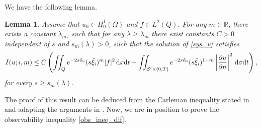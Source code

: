 \documentclass{aims}
\newtheorem{lemma}[theorem]{Lemma}
\theoremstyle{definition}
\def\dx{\,\textnormal{d}x}
\def\dt{\textnormal{d}t}
\def\d{\,\textnormal{d}}
\begin{document}
We have the following lemma.
%
\begin{lemma}\label{lemma_car_boundary}
Assume that $u_0\in H_0^1(\Omega)$ and $f\in L^2(Q)$. For any $m\in \mathbb R$, there exists a constant $\lambda_m$, such that for any $\lambda\geq \lambda_m$ there exist constants $C>0$ independent of $s$ and $s_m(\lambda)>0$, such that the solution of \eqref{sys_u} satisfies
%
\begin{equation}\label{Est1}
I(u;i,m)\leq C\left(\iint_{Q}e^{-2s\tilde{\alpha}_i}(s\tilde{\xi}_i)^m|f|^2\dx\dt+\iint_{\mathcal S^\prime\times(0,T)}e^{-2s\tilde{\alpha}_i}(s\tilde{\xi}_i)^{1+m}\left|\frac{\partial u}{\partial n}\right|^2\d\sigma\dt\right),
\end{equation}
%
for every $s\geq s_m(\lambda)$. 
\end{lemma}
%
The proof of this result can be deduced from the Carleman inequality stated in \cite[Lemma 1.1]{ima_original} and adapting the arguments in \cite[Lemma 2.3]{ima_yama}. Now, we are in position to prove the observability inequality \eqref{obs_ineq_dif}.
\end{document}
